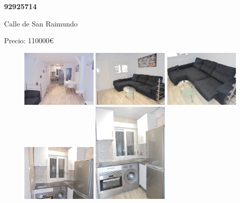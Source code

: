 \documentclass[10pt,a4paper]{report}
\begin{document}
\newpage
\begin{center}
\begin{large}
\textbf{92925714}\\[10px]
\end{large}
Calle de San Raimundo
\end{center}
Precio: 110000€
\begin{figure}[htbp]

\includegraphics[width=0.32\textwidth]{arfima/92925714/92925714-001.jpg}
\includegraphics[width=0.32\textwidth]{arfima/92925714/92925714-002.jpg}
\includegraphics[width=0.32\textwidth]{arfima/92925714/92925714-003.jpg}
\includegraphics[width=0.32\textwidth]{arfima/92925714/92925714-004.jpg}
\includegraphics[width=0.32\textwidth]{arfima/92925714/92925714-005.jpg}

\end{figure}
\end{document}

